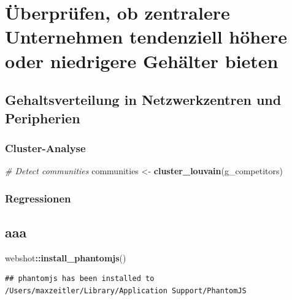 \documentclass[
]{article}
\newenvironment{Shaded}{\begin{snugshade}}{\end{snugshade}}
\newcommand{\CommentTok}[1]{\textcolor[rgb]{0.56,0.35,0.01}{\textit{#1}}}
\newcommand{\FunctionTok}[1]{\textcolor[rgb]{0.13,0.29,0.53}{\textbf{#1}}}
\newcommand{\NormalTok}[1]{#1}
\newcommand{\OtherTok}[1]{\textcolor[rgb]{0.56,0.35,0.01}{#1}}
\newcommand{\SpecialCharTok}[1]{\textcolor[rgb]{0.81,0.36,0.00}{\textbf{#1}}}
\begin{document}
\section{Überprüfen, ob zentralere Unternehmen tendenziell höhere oder
niedrigere Gehälter
bieten}\label{uxfcberpruxfcfen-ob-zentralere-unternehmen-tendenziell-huxf6here-oder-niedrigere-gehuxe4lter-bieten}

\subsection{Gehaltsverteilung in Netzwerkzentren und
Peripherien}\label{gehaltsverteilung-in-netzwerkzentren-und-peripherien}

\subsubsection{Cluster-Analyse}\label{cluster-analyse}

\begin{Shaded}
\begin{Highlighting}[]
\CommentTok{\# Detect communities}
\NormalTok{communities }\OtherTok{\textless{}{-}} \FunctionTok{cluster\_louvain}\NormalTok{(g\_competitors)}
\end{Highlighting}
\end{Shaded}

\subsubsection{Regressionen}\label{regressionen}

\subsection{aaa}\label{aaa}

\begin{Shaded}
\begin{Highlighting}[]
\NormalTok{webshot}\SpecialCharTok{::}\FunctionTok{install\_phantomjs}\NormalTok{()}
\end{Highlighting}
\end{Shaded}

\begin{verbatim}
## phantomjs has been installed to /Users/maxzeitler/Library/Application Support/PhantomJS
\end{verbatim}
\end{document}
